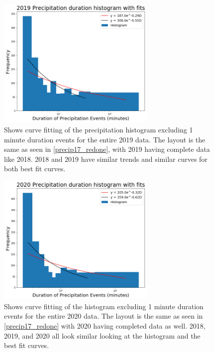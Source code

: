 \documentclass[11pt]{report}
\begin{document}
\begin{figure}[t]
	\centering
	\includegraphics[width=0.675\textwidth]{Figures/precip19_new.png}
	\caption[2019 precipitation duration Exponentials with contrasting curve fitting]
	{\label{precip19_redone}
		Shows curve fitting of the precipitation histogram excluding 1 minute duration events for the entire 2019 data. The layout is the same as seen in \ref{precip17_redone}, with 2019 having complete data like 2018. 2018 and 2019 have similar trends and similar curves for both best fit curves.  }
\end{figure}
\begin{figure}[b]
	\centering
	\includegraphics[width=0.675\textwidth]{Figures/precip20_new.png}
	\caption[2020 precipitation duration Exponentials with contrasting curve fitting]
	{\label{precip20_redone}
		Shows curve fitting of the histogram excluding 1 minute duration events for the entire 2020 data. The layout is the same as seen in \ref{precip17_redone} with 2020 having completed data as well. 2018, 2019, and 2020 all look similar looking at the histogram and the best fit curves.   }
\end{figure}
\clearpage
\end{document}

